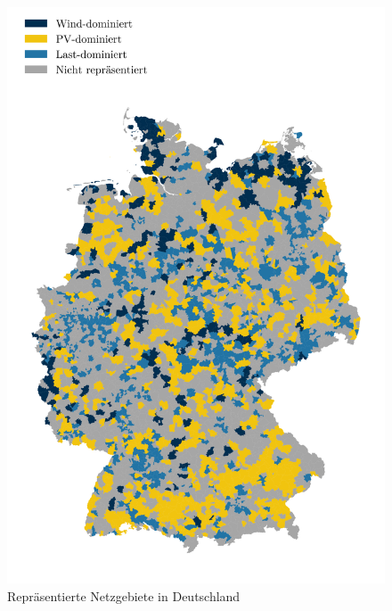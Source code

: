 \begin{figure}
    \centering
    \includegraphics[width=\textwidth]{Bilder/clusters_representatives}
    \caption{Repräsentierte Netzgebiete in Deutschland}\label{fig:map_representatives}
\end{figure}